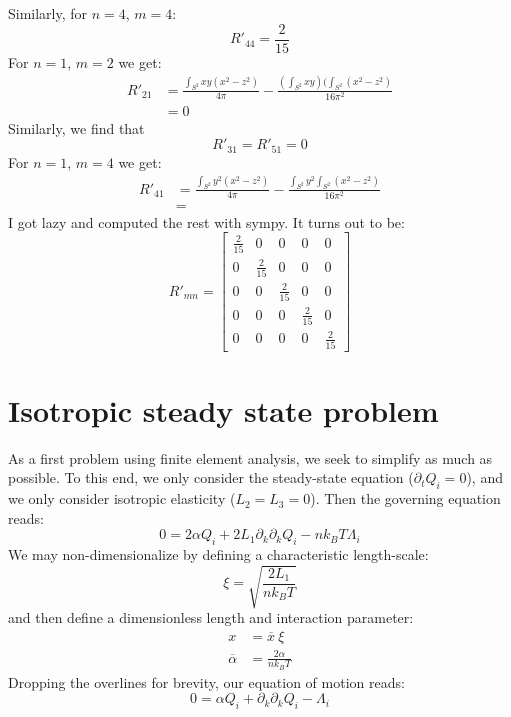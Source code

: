 \documentclass[reqno]{article}
\begin{document}
	Similarly, for $n = 4$, $m = 4$:
	\begin{equation}
		R'_{44} = \frac{2}{15}
	\end{equation}
	For $n = 1$, $m = 2$ we get:
	\begin{equation}
	\begin{split}
		R'_{21}
		&= \frac{\int_{S^2} xy (x^2 - z^2)}{4 \pi}
		- \frac{(\int_{S^2} xy)(\int_{S^2} (x^2 - z^2)}{16 \pi^2} \\
		&= 0
	\end{split}
	\end{equation}
	Similarly, we find that
	\begin{equation}
		R'_{31} = R'_{51} = 0
	\end{equation}
	For $n = 1$, $m = 4$ we get:
	\begin{equation}
	\begin{split}
		R'_{41}
		&= \frac{\int_{S^2} y^2 (x^2 - z^2)}{4\pi}
		- \frac{\int_{S^2} y^2 \int_{S^2} (x^2 - z^2)}{16 \pi^2} \\
		&= 
	\end{split}
	\end{equation}
	I got lazy and computed the rest with sympy.
	It turns out to be:
	\begin{equation}
		R'_{mn}
		=
		\begin{bmatrix}
			\frac{2}{15} &0 &0 &0 &0 \\
			0 &\frac{2}{15} &0 &0 &0 \\
			0 &0 &\frac{2}{15} &0 &0 \\
			0 &0 &0 &\frac{2}{15} &0 \\
			0 &0 &0 &0 &\frac{2}{15}
		\end{bmatrix}
	\end{equation}
	
	\section{Isotropic steady state problem}
	As a first problem using finite element analysis, we seek to simplify as much as possible.
	To this end, we only consider the steady-state equation ($\partial_t Q_i = 0$), and we only consider isotropic elasticity ($L_2 = L_3 = 0$).
	Then the governing equation reads:
	\begin{equation}
		0
		= 2 \alpha Q_i
		+ 2 L_1 \partial_k \partial_k Q_i
		- n k_B T \Lambda_i
	\end{equation}
	We may non-dimensionalize by defining a characteristic length-scale:
	\begin{equation}
		\xi = \sqrt{\frac{2 L_1}{n k_B T}}
	\end{equation}
	and then define a dimensionless length and interaction parameter:
	\begin{align}
		x &= \overline{x} \: \xi \\
		\overline{\alpha} &= \frac{2 \alpha}{n k_B T}
	\end{align}
	Dropping the overlines for brevity, our equation of motion reads:
	\begin{equation}
		0 = \alpha Q_i + \partial_k \partial_k Q_i - \Lambda_i
	\end{equation}
	
\end{document}
